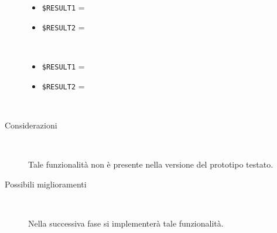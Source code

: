 \documentclass[../../SperimentazioniPratiche.tex]{subfiles}
\begin{document}
\begin{tcolorbox}[fonttitle=\bfseries, 
								adjusted title={\Large Prova 12A.1}, 
								breakable, 
								sharp corners=south,
								colback=white, 
								colframe=white!60!black]
\begin{description}[leftmargin=0.7cm,labelwidth=!]
					\tcbline        				
        				
        			\item[Output riscontrato] \ \par
        				\begin{description}
        				
        					\item[\dispositivoA] \ \par
        					\begin{itemize}
        						\item \verb|$RESULT1| = \ns
        						\item \verb|$RESULT2| = \ns
        					\end{itemize}      					
        					
        					\item[\dispositivoB] \ \par
        					\begin{itemize}
        						\item \verb|$RESULT1| = \ns
        						\item \verb|$RESULT2| = \ns
        					\end{itemize}
        					
        				\end{description}
        				
        			\tcbline
        			
        			\item[Analisi risultati] \ \par
        				\begin{description}
        					\item[Considerazioni] \ \par
        						Tale funzionalità non è presente nella versione del prototipo testato.
        					
        					\item[Possibili miglioramenti] \ \par 
        						Nella successiva fase si implementerà tale funzionalità.
        				\end{description}
        				
				\end{description}  
				
			\end{tcolorbox}



	
	\newpage	
\end{document}
